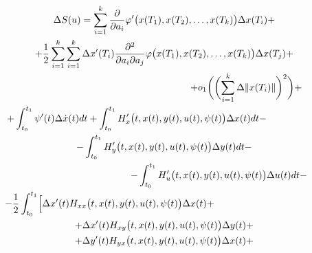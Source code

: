\begin{multline}

\Delta S(u)= \sum_{i=1}^{k} 

\dfrac{\partial } {\partial a_{i}} \varphi' \bigl(x(T_{1}), x(T_{2}), \ldots, x(T_{k})\bigr)

 \Delta x(T_{i}) + \\

+\frac{1}{2} \sum_{i=1}^{k} \sum_{i=1}^{k} \Delta x'(T_{i})  

\dfrac{\partial^{2} } {\partial a_{i} \partial a_{j}} \varphi \bigl(x(T_{1}), x(T_{2}), \ldots, x(T_{k})\bigr) 

\Delta x(T_{j}) +

\\

\hspace{6cm}

 +o_{1} \biggl( \biggl( \sum_{i=1}^{k} \Delta \Vert x(T_{i}) \Vert  \biggr)^{2} \biggr) + 

 \\

+\int_{t_{0}}^{t_{1}} \psi'(t) \Delta \dot{x} (t) dt + \int_{t_{0}}^{t_{1}}

H'_{x}\bigl(t, x(t), y(t), u(t), \psi (t) \bigr) \Delta x(t) dt - \hspace{2cm} \\ 

-\int_{t_{0}}^{t_{1}} 

H'_{y} \bigl(t, x(t), y(t), u(t), \psi (t)\bigr) \Delta y(t) dt- \\

 \hspace{4cm} 

- \int_{t_{0}}^{t_{1}} 

H'_{u} \bigl(t, x(t), y(t), u(t), \psi (t) \bigr) \Delta u(t) dt -   \\ 

-\frac{1}{2} \int_{t_{0}}^{t_{1}} 

\Bigl[ \Delta x'(t) H_{xx} \bigl(t, x(t), y(t), u(t), \psi (t) \bigr) \Delta x(t) + 

 \hspace{4cm} 

\\

+\Delta x'(t) H_{xy} \bigl(t, x(t), y(t), u(t), \psi (t)\bigr) \Delta y(t) +

\\

+\Delta y'(t) H_{yx} \bigl(t, x(t), y(t), u(t), \psi (t)\bigr) \Delta x(t)+ 


\end{multline}
